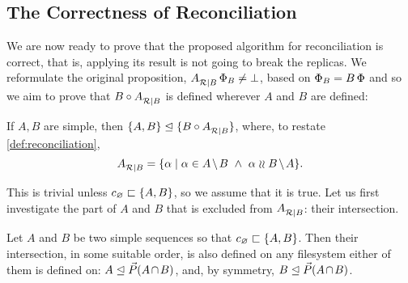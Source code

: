
\subsection{The Correctness of Reconciliation}

We are now ready to prove that the proposed algorithm for reconciliation is correct,
that is, applying its result is not going to break the replicas.
We reformulate the original proposition, ${A}^{}_{\mathcal{R}|{B}}\,\Phi_B\neq\bot$,
based on $\Phi_B=B\,\Phi$ and so we aim to prove that
$B\circ{A}^{}_{\mathcal{R}|{B}}$ is defined wherever $A$ and $B$ are defined:

\begin{myth}\label{reconciliation_correct}
If $A, B$ are simple, then ${\{{A,B}\}}\trianglelefteq{\{{B\circ{A}^{}_{\mathcal{R}|{B}}}\}}$,
where, to restate \cref{def:reconciliation},
\[ \reca = \{\alpha \whr \alpha\in \ambnp  \ \wedge\   \alpha\indep \bmanp \}. \]
\end{myth}

This is trivial unless $c_\varnothing\sqsubset{\{{A,B}\}}$, so we assume that it is true.
Let us first investigate the part of $A$ and $B$ that is excluded from
${A}^{}_{\mathcal{R}|{B}}$: their intersection.

\begin{mylem}\label{can_move_intersection}
Let $A$ and $B$ be two simple sequences so that $c_\varnothing\sqsubset{\{{A, B}\}}$.
Then their intersection, in some suitable order, is also defined on any filesystem
either of them is defined on:
$\worksm{A}{\orderset{\acbnp}}$, and, by symmetry,
$\worksm{B}{\orderset{\acbnp}}$.
\end{mylem}

